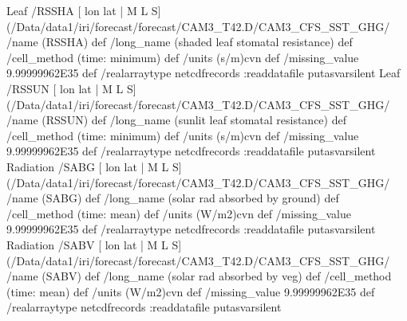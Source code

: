 \begin{ingrid}
Leaf /RSSHA{
[ lon lat | M L S] (/Data/data1/iri/forecast/forecast/CAM3_T42.D/CAM3_CFS_SST_GHG/%
/name (RSSHA) def
 /long_name (shaded leaf stomatal resistance) def
 /cell_method (time: minimum) def
 /units (s/m)cvn def
 /missing_value 9.99999962E35 def
 /realarraytype netcdfrecords :readdatafile
}putasvarsilent
Leaf /RSSUN{
[ lon lat | M L S] (/Data/data1/iri/forecast/forecast/CAM3_T42.D/CAM3_CFS_SST_GHG/%
/name (RSSUN) def
 /long_name (sunlit leaf stomatal resistance) def
 /cell_method (time: minimum) def
 /units (s/m)cvn def
 /missing_value 9.99999962E35 def
 /realarraytype netcdfrecords :readdatafile
}putasvarsilent
Radiation /SABG{
[ lon lat | M L S] (/Data/data1/iri/forecast/forecast/CAM3_T42.D/CAM3_CFS_SST_GHG/%
/name (SABG) def
 /long_name (solar rad absorbed by ground) def
 /cell_method (time: mean) def
 /units (W/m2)cvn def
 /missing_value 9.99999962E35 def
 /realarraytype netcdfrecords :readdatafile
}putasvarsilent
Radiation /SABV{
[ lon lat | M L S] (/Data/data1/iri/forecast/forecast/CAM3_T42.D/CAM3_CFS_SST_GHG/%
/name (SABV) def
 /long_name (solar rad absorbed by veg) def
 /cell_method (time: mean) def
 /units (W/m2)cvn def
 /missing_value 9.99999962E35 def
 /realarraytype netcdfrecords :readdatafile
}putasvarsilent


\end{ingrid}
